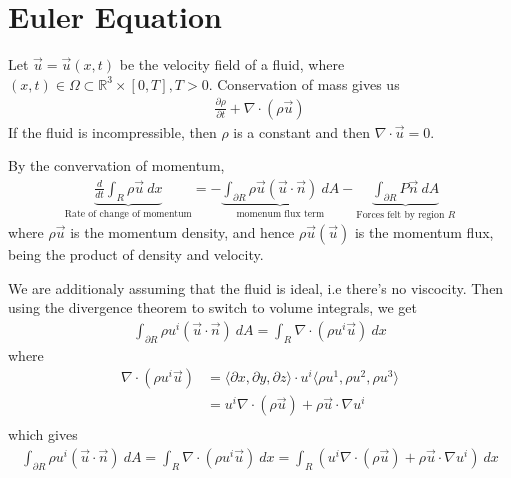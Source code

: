 

\section{Euler Equation}

Let $\vec{u} = \vec{u}(x, t)$ be the velocity field of a fluid, where
$(x, t ) \in \Omega \subset \mathbb{R}^3 \times [0, T], T > 0$.
Conservation of mass gives us
\begin{align*}
  \frac{\partial \rho}{\partial t} + \nabla \cdot(\rho \vec{u})
\end{align*}
If the fluid is incompressible, then $\rho$ is a constant and then
$\nabla \cdot \vec{u} = 0$.

By the convervation of momentum,
\begin{align*}
  \underbrace{\frac{d }{d t} \int_R \rho \vec{u} \ d x}_{\textrm{Rate
  of change of momentum}}  = - \underbrace{\int_{\partial R}  \rho
  \vec{u}(\vec{u} \cdot \vec{n}) \ d  A}_{\textrm{momenum flux term}}
  - \underbrace{\int_{\partial R} P \vec{n} \ d  A}_{\textrm{Forces
  felt by region $R$}}
\end{align*}
where $ \rho \vec{u}$ is the momentum density, and hence $\rho
\vec{u} ( \vec{u})$ is the momentum flux, being the product of
density and velocity.

We are additionaly assuming that the fluid is ideal, i.e there's no
viscocity. Then using the divergence theorem to switch to volume
integrals, we get
\begin{align*}
  \int_{\partial R}  \rho u^i(\vec{u} \cdot \vec{n}) \ d A = \int_R
  \nabla \cdot (\rho u ^i \vec{u}) \ d  x
\end{align*}
where
\begin{align*}
  \nabla \cdot(\rho u^i \vec{u}) & = \langle \partial x , \partial y,
  \partial z \rangle \cdot u^i \langle \rho u^1, \rho u^2 , \rho u^3 \rangle  \\
  &= u^i \nabla \cdot(\rho \vec{u}) + \rho \vec{u}\cdot \nabla u^i \\
\end{align*}
which gives
\begin{align*}
  \int_{\partial R}  \rho u^i(\vec{u} \cdot \vec{n}) \ d A = \int_R
  \nabla \cdot (\rho u ^i \vec{u}) \ d  x = \int_R (u^i \nabla
  \cdot(\rho \vec{u}) + \rho \vec{u}\cdot \nabla u^i) \ d x
\end{align*}

